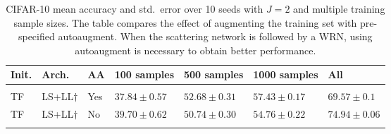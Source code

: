 \documentclass[10pt,twocolumn,letterpaper]{article}
\begin{document}
\begin{table}[H] 
    \centering
    \caption{CIFAR-10 mean accuracy and std.\ error over 10 seeds with $J=2$ and multiple training sample sizes. The table compares the effect of augmenting the training set with pre-specified autoaugment. When the scattering network is followed by a WRN, using autoaugment is necessary to obtain better performance.  } 
    \label{table:cifarresultsnoaa}
    \small
      \fontsize{8.5}{8.5}\selectfont 
    \begin{tabularx}{340pt}{lllllll}  
        \hline
        Init. &Arch.& AA &100 samples & 500 samples & 1000 samples & All \\
        \hline
        \\[-2mm]
        TF &LS+LL$\dagger$&Yes&$37.84\pm0.57$ & $\mathbf{52.68}\pm0.31$ &$\mathbf{57.43}\pm0.17$&$69.57\pm0.1$ \\ 
        TF &LS+LL$\dagger$&No&$\mathbf{39.70}\pm0.62$ & $50.74\pm0.30$ &$54.76\pm0.22$&$\mathbf{74.94}\pm0.06$ \\ 
            \hline
        \\[-2mm]


\end{tabularx}
\end{table}
\end{document}
